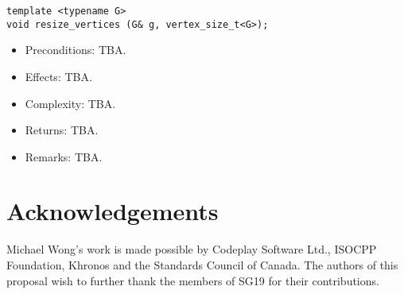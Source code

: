 \documentclass[10pt,onecolumn]{article}
\begin{document}
\vspace{10pt}

\begin{lstlisting}
template <typename G>
void resize_vertices (G& g, vertex_size_t<G>);
\end{lstlisting}
%
\begin{itemize}
\item Preconditions: TBA.
\item Effects: TBA.
\item Complexity: TBA.
\item Returns: TBA.
\item Remarks: TBA.
\end{itemize}

\section{Acknowledgements}
Michael Wong's work is made possible by Codeplay Software Ltd., ISOCPP Foundation, Khronos and the Standards Council of Canada.  The authors of this proposal wish to further thank the members of SG19 for their contributions.

\footnotesize


\normalsize
\end{document}
